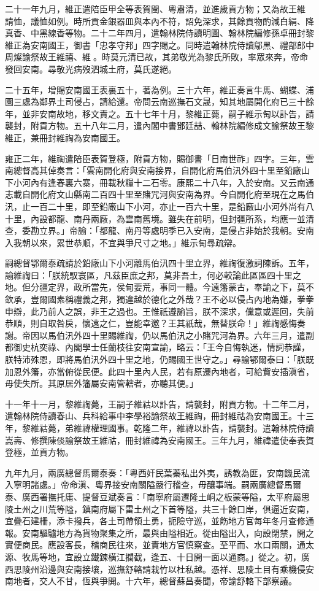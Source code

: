 \begin{pinyinscope}
二十一年九月，維正遣陪臣甲全等表賀閩、粵肅清，並進歲貢方物；又為故王維請恤，議恤如例。時所貢金銀器皿與本內不符，詔免深求，其餘貢物酌減白絹、降真香、中黑線香等物。二十二年四月，遣翰林院侍讀明圖、翰林院編修孫卓冊封黎維正為安南國王，御書「忠孝守邦」四字賜之。同時遣翰林院侍讀鄔黑、禮部郎中周燦諭祭故王維禧、維。時莫元清已故，其弟敬光為黎氏所敗，率眾來奔，帝命發回安南。尋敬光病歿泗城土府，莫氏遂絕。

二十五年，增賜安南國王表裏五十，著為例。三十六年，維正奏言牛馬、蝴蝶、浦園三處為鄰界土司侵占，請給還。帝問云南巡撫石文晟，知其地屬開化府已三十餘年，並非安南故地，移文責之。五十七年十月，黎維正薨，嗣子維示匋以訃告，請襲封，附貢方物。五十八年二月，遣內閣中書鄧廷喆、翰林院編修成文諭祭故王黎維正，兼冊封維祹為安南國王。

雍正二年，維祹遣陪臣表賀登極，附貢方物，賜御書「日南世祚」四字。三年，雲南總督高其倬奏言：「雲南開化府與安南接界，自開化府馬伯汛外四十里至鉛廠山下小河內有逢春裏六寨，冊載秋糧十二石零。康熙二十八年，入於安南。又云南通志載自開化府文山縣南二百四十里至賭咒河與安南為界。今自開化府至現在之馬伯汛，止一百二十里，即至鉛廠山下小河，亦止一百六十里，是鉛廠山小河外尚有八十里，內設都龍、南丹兩廠，為雲南舊境。雖失在前明，但封疆所系，均應一並清查，委勘立界。」帝諭：「都龍、南丹等處明季已入安南，是侵占非始於我朝。安南入我朝以來，累世恭順，不宜與爭尺寸之地。」維示匋尋疏辯。

嗣總督鄂爾泰疏請於鉛廠山下小河離馬伯汛四十里立界，維祹復激詞陳訴。五年，諭維祹曰：「朕統馭寰區，凡茲臣庶之邦，莫非吾土，何必較論此區區四十里之地。但分疆定界，政所當先，侯甸要荒，事同一體。今遠籓蒙古，奉諭之下，莫不欽承，豈爾國素稱禮義之邦，獨違越於德化之外哉？王不必以侵占內地為嫌，拳拳申辯，此乃前人之誤，非王之過也。王惟祇遵諭旨，朕不深求，儻意或遲回，失前恭順，則自取咎戾，懷遠之仁，豈能幸邀？王其祇哉，無替朕命！」維祹感悔奏謝。帝因以馬伯汛外四十里賜維祹，仍以馬伯汛之小賭咒河為界。六年三月，遣副都御史杭奕祿、內閣學士任蘭枝往安南宣諭，略云：「王今自悔執迷，情詞恭謹，朕特沛殊恩，即將馬伯汛外四十里之地，仍賜國王世守之。」尋諭鄂爾泰曰：「朕既加恩外籓，亦當俯從民便。此四十里內人民，若有原遷內地者，可給貲安插滇省，毋使失所。其原居外籓屬安南管轄者，亦聽其便。」

十一年十一月，黎維祹薨，王嗣子維祜以訃告，請襲封，附貢方物。十二年二月，遣翰林院侍讀春山、兵科給事中李學裕諭祭故王維祹，冊封維祜為安南國王。十三年，黎維祜薨，弟維禕權理國事。乾隆二年，維禕以訃告，請襲封。遣翰林院侍讀嵩壽、修撰陳倓諭祭故王維祜，冊封維禕為安南國王。三年九月，維禕遣使奉表賀登極，並貢方物。

九年九月，兩廣總督馬爾泰奏：「粵西奸民葉蓁私出外夷，誘教為匪，安南饑民流入寧明諸處。」帝命滇、粵界接安南關隘嚴行稽查，毋釀事端。嗣兩廣總督馬爾泰、廣西署撫托庸、提督豆斌奏言：「南寧府屬遷隆土峒之板蒙等隘，太平府屬思陵土州之川荒等隘，鎮南府屬下雷土州之下首等隘，共三十餘口岸，俱逼近安南，宜疊石建柵，添卡撥兵，各土司帶領土勇，扼險守巡，並飭地方官每年冬月查修通報。安南驅驢地方為貨物聚集之所，最與由隘相近。從由隘出入，向設閉禁，開之實便商民。應設客長，稽商民往來，並責地方官慎察查。至平而、水口兩關，通太源、牧馬等地，宜設立鐵鍊橫江攔截，逢五、十日開一面以通商。」從之。初，廣西思陵州沿邊與安南接壤，巡撫舒輅請栽竹以杜私越。憑祥、思陵土目有乘機侵安南地者，交人不甘，恆與爭閧。十六年，總督蘇昌奏聞，帝諭舒輅下部察議。


\end{pinyinscope}
